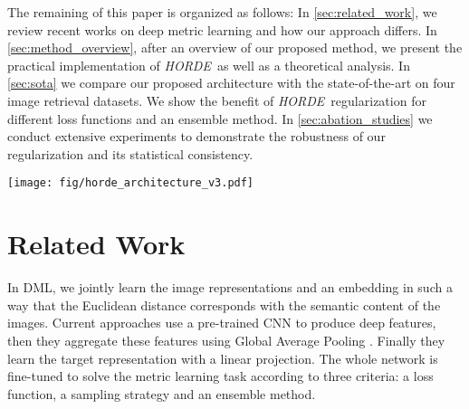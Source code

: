 \documentclass[10pt,twocolumn,letterpaper]{article}
\def\ourmethod{\textit{HORDE}}
\begin{document}
    The remaining of this paper is organized as follows:
    In \autoref{sec:related_work}, we review recent works on deep metric learning and how our approach differs.
    In \autoref{sec:method_overview}, after an overview of our proposed method, we present the practical implementation of \ourmethod \ as well as a theoretical analysis.
    In \autoref{sec:sota} we compare our proposed architecture with the state-of-the-art on four image retrieval datasets.
    We show the benefit of \ourmethod \ regularization for different loss functions and an ensemble method.
    In \autoref{sec:abation_studies} we conduct extensive experiments to demonstrate the robustness of our regularization and its statistical consistency.
 
\begin{figure*}
    \centering
    \texttt{[image: fig/horde\_architecture\_v3.pdf]}
    \caption{Global overview of our \ourmethod \ architecture. The deep convolutional neural network extracts $h \times w \times c$ deep features. The standard architecture (top blue block) relies on a global average pooling and an embedding before computing the $\mathcal{L}_{\text{DML}}$ loss. The bottom red block is our \ourmethod \ regularizer, composed by the approximation of all high-order moments $\boldsymbol{\phi}_k$,  global average pooling and embeddings before computing the sum of each $\mathcal{L}_k$ loss.}
    \label{fig:horde_architecture}
\end{figure*}
    
\section{Related Work}\label{sec:related_work}
    In DML, we jointly learn the image representations and an embedding in such a way that the Euclidean distance corresponds with the semantic content of the images.
    Current approaches use a pre-trained CNN to produce deep features, then they aggregate these features using Global Average Pooling \cite{Zhou_2016_CVPR}.
    Finally they learn the target representation with a linear projection.
The whole network is fine-tuned to solve the metric learning task according to three criteria: a loss function, a sampling strategy and an ensemble method.
    
\end{document}

